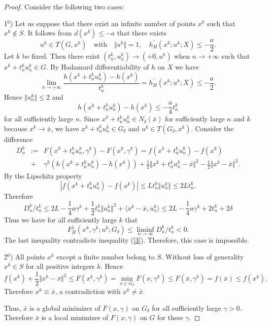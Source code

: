 \documentclass[12pt]{article}
\def\ld#1{#1^{\downarrow}_{H}}
\newcommand{\scalpr}[2]{\langle#1,#2\rangle}
\newcommand{\norm}[1]{\Vert#1\Vert}
\begin{document}
\begin{proof}
Consider the following two cases:

1$^0$) 
Let us suppose that there exist an infinite number of points $x^k$ such that $x^k\notin S$. 
It follows from $d(x^k)\le -a$ that there exists
\[
u^k\in T(G,x^k) \quad\textrm{with}\quad
\norm{u^k}=1,\quad  h^\prime_H(x^k;u^k;X)\le -\frac{a}{2}.
\]
Let $k$ be fixed. Then
there exist $(t^k_n,u^k_n)\to(+0,u^k)$ when $n\to +\infty$ such that
$x^k+t^k_n u^k_n\in G$. By Hadamard differentiability of $h$ on $X$ we have
\begin{equation}\label{p2}
\lim_{n\to+\infty}\frac{h(x^k+t^k_n u^k_n)-h(x^k)}{t^k_n}=
h^\prime_H(x^k;u^k;X)\le -\frac{a}{2}.
\end{equation}
Hence $\norm{u^k_n}\le 2$ and
\begin{equation}\label{p3}
h(x^k+t^k_n u^k_n)-h(x^k)\le -\frac{a}{4}t^k_n
\end{equation}
for all sufficiently large $n$. Since $x^k+t^k_n u^k_n\in N_\delta(\bar x)$
for sufficiently large $n$ and $k$ because $x^k\to\bar x$, we have $x^k+t^k_n u^k_n\in G_\delta$
and $u^k\in T(G_\delta,x^k)$. Consider the difference
\[
\begin{array}{rrl}
D^k_n & := & F(x^k+t^k_n u^k_n,\gamma^k)-F(x^k,\gamma^k)=f(x^k+t^k_n u^k_n)-f(x^k)\\
&+ & \gamma^k(h(x^k+t^k_n u^k_n)-h(x^k))+\frac{1}{2}\norm{x^k+t^k_n u^k_n-\bar x}^2-
\frac{1}{2}\norm{x^k-\bar x}^2.
\end{array}
\]
By the Lipschitz property
\[
|f(x^k+t^k_n u^k_n)-f(x^k)|\le L t^k_n\norm{u^k_n}\le 2L t^k_n.
\]
Therefore
\[
D^k_n/t^k_n\le 2L-\frac{1}{4}a\gamma^k+\frac{1}{2}t^k_n\norm{u^k_n}^2+
\scalpr{x^k-\bar x}{u^k_n}\le 2L-\frac{1}{4} a\gamma^k+2t^k_n+2\delta
\]
Thus we have for all sufficiently large $k$ that
\[
\ld F(x^k,\gamma^k;u^k;G_\delta)\le\liminf_{n\to\infty}D^k_n/t^k_n<0.
\]
The last inequality  contradicts inequality (\ref{3}). Therefore, this case is impossible. 

2$^0$) All points $x^k$ except a finite number belong to $S$.
Without loss of generality $x^k\in S$ for all positive integers $k$. Hence
\[
f(x^k)+
\frac{1}{2}\norm{x^k-\bar x}^2\le F(x^k,\gamma^k)=\min_{x\in G_\delta}F(x,\gamma^k)
\le F(\bar x,\gamma^k)=f(\bar x)\le f(x^k).
\]
Therefore $x^k\equiv\bar x$, a contradiction with $x^k\ne\bar x$.
 
Thus,  $\bar x$ is a global minimizer of $F(x,\gamma)$ on
$G_\delta$ for all sufficiently large $\gamma>0$. Therefore
$\bar x$ is a local minimizer of $F(x,\gamma)$ on $G$ for these $\gamma$.
\end{proof}
\end{document}
